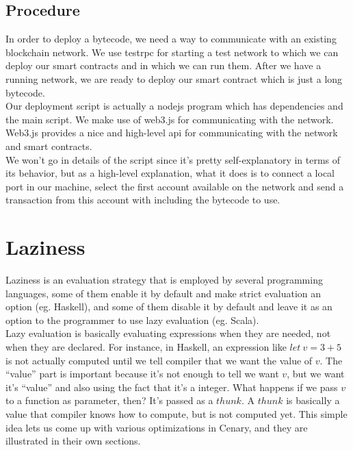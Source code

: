 \documentclass{article}
\begin{document}
\subsection{Procedure}
In order to deploy a bytecode, we need a way to communicate with an existing blockchain network. We use testrpc\cite{testrpc} for starting a test network to which we can deploy our smart contracts and in which we can run them. After we have a running network, we are ready to deploy our smart contract which is just a long bytecode. \\

Our deployment script is actually a nodejs\cite{nodejs} program which has dependencies and the main script. We make use of web3.js\cite{web3js} for communicating with the network. Web3.js provides a nice and high-level api for communicating with the network and smart contracts. \\

We won't go in details of the script since it's pretty self-explanatory in terms of its behavior, but as a high-level explanation, what it does is to connect a local port in our machine, select the first account available on the network and send a transaction from this account with including the bytecode to use.
\newpage
\section{Laziness}
\label{laziness}
Laziness is an evaluation strategy that is employed by several programming languages, some of them enable it by default and make strict evaluation an option (eg. Haskell\cite{haskell}), and some of them disable it by default and leave it as an option to the programmer to use lazy evaluation (eg. Scala\cite{scala}). \\

Lazy evaluation is basically evaluating expressions when they are needed, not when they are declared. For instance, in Haskell, an expression like $let\ v = 3 + 5$ is not actually computed until we tell compiler that we want the value of $v$. The ``value'' part is important because it's not enough to tell we want $v$, but we want it's ``value'' and also using the fact that it's a integer. What happens if we pass $v$ to a function as parameter, then? It's passed as a $thunk$. A $thunk$ is basically a value that compiler knows how to compute, but is not computed yet. This simple idea lets us come up with various optimizations in Cenary, and they are illustrated in their own sections.
\end{document}
